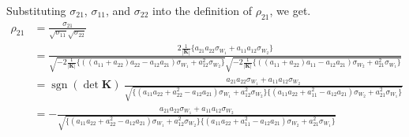 \documentclass{article}
\begin{document}
Substituting $\sigma_{21}$, $\sigma_{11}$, and $\sigma_{22}$ into the definition of $\rho_{21}$, we get.
\begin{equation}
\begin{aligned}
 \rho_{21} &=\frac{\sigma_{21}}{\sqrt{\sigma_{11}}\sqrt{\sigma_{22}}} \\
  & =\frac{ 2 \frac{1}{|\mathbf{K}|} \{ a_{21} a_{22} \sigma_{W_1}+ a_{11} a_{12}\sigma_{W_2} \} }
  {\sqrt{-2 \frac{1}{|\mathbf{K}|} \{ \left ((a_{11}+a_{22})a_{22}-a_{12}a_{21} \right)\sigma_{W_1}+a_{12}^2 \sigma_{W_2} \}} \sqrt{-2 \frac{1}{|\mathbf{K}|} \{ \left ( (a_{11}+a_{22})a_{11}- a_{12}a_{21} \right)\sigma_{W_2} + a_{21}^2\sigma_{W_1} \} }} \\
  &= \operatorname{sgn}(\det \mathbf{K}) \ \frac{a_{21} a_{22} \sigma_{W_1}+ a_{11} a_{12}\sigma_{W_2}}{ \sqrt{ \{ \left (a_{11} a_{22} +a_{22}^2-a_{12}a_{21} \right)\sigma_{W_1}+a_{12}^2 \sigma_{W_2} \} \{ \left (  a_{11}a_{22} + a_{11}^2 - a_{12}a_{21} \right)\sigma_{W_2} + a_{21}^2\sigma_{W_1}  \} }} \\
  &=- \frac{a_{21} a_{22} \sigma_{W_1}+ a_{11} a_{12}\sigma_{W_2}}{ \sqrt{ \{ \left (a_{11} a_{22} +a_{22}^2-a_{12}a_{21} \right)\sigma_{W_1}+a_{12}^2 \sigma_{W_2} \} \{ \left (  a_{11}a_{22} + a_{11}^2 - a_{12}a_{21} \right)\sigma_{W_2} + a_{21}^2\sigma_{W_1}  \} }}
\end{aligned}
\label{eq:rho12_0}
\end{equation}



\end{document}
